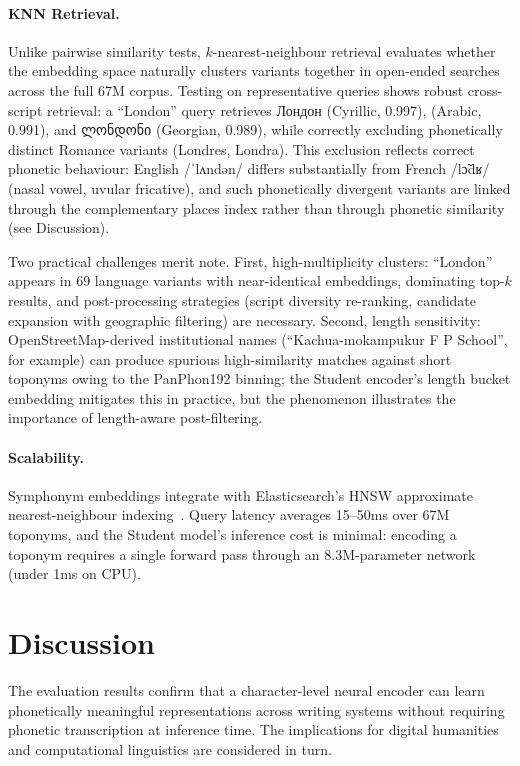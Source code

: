 \documentclass[11pt,a4paper]{article}
\newcommand{\textar}[1]{{\arabicfont\RL{#1}}}
\newcommand{\textgeorgian}[1]{{\georgianfont #1}}
\begin{document}
\paragraph{KNN Retrieval.} Unlike pairwise similarity tests, $k$-nearest-neighbour retrieval evaluates whether the embedding space naturally clusters variants together in open-ended searches across the full 67M corpus. Testing on representative queries shows robust cross-script retrieval: a ``London'' query retrieves Лондон (Cyrillic, 0.997), \textar{لندون} (Arabic, 0.991), and \textgeorgian{ლონდონი} (Georgian, 0.989), while correctly excluding phonetically distinct Romance variants (Londres, Londra). This exclusion reflects correct phonetic behaviour: English /ˈlʌndən/ differs substantially from French /lɔ̃dʁ/ (nasal vowel, uvular fricative), and such phonetically divergent variants are linked through the complementary places index rather than through phonetic similarity (see Discussion).

Two practical challenges merit note. First, high-multiplicity clusters: ``London'' appears in 69 language variants with near-identical embeddings, dominating top-$k$ results, and post-processing strategies (script diversity re-ranking, candidate expansion with geographic filtering) are necessary. Second, length sensitivity: OpenStreetMap-derived institutional names (``Kachua-mokampukur F P School'', for example) can produce spurious high-similarity matches against short toponyms owing to the PanPhon192 binning; the Student encoder's length bucket embedding mitigates this in practice, but the phenomenon illustrates the importance of length-aware post-filtering.

\paragraph{Scalability.} Symphonym embeddings integrate with Elasticsearch's HNSW approximate nearest-neighbour indexing~\citep{malkov2020hnsw}. Query latency averages 15--50ms over 67M toponyms, and the Student model's inference cost is minimal: encoding a toponym requires a single forward pass through an 8.3M-parameter network (under 1ms on CPU).

\section{Discussion}
\label{sec:discussion}

The evaluation results confirm that a character-level neural encoder can learn phonetically meaningful representations across writing systems without requiring phonetic transcription at inference time. The implications for digital humanities and computational linguistics are considered in turn.
\end{document}
